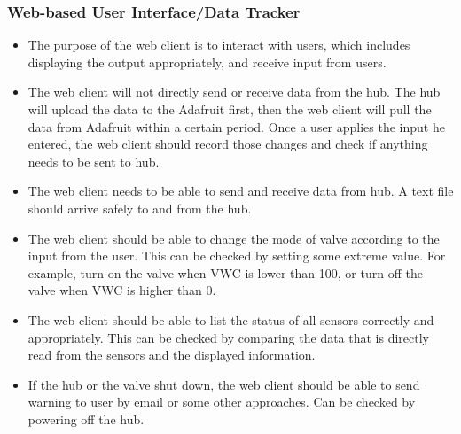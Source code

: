 \documentclass[onecolumn, draftclsnofoot,10pt, compsoc]{IEEEtran}
\newcounter{subsubsubsection}[subsubsection]
\newcounter{subsubsubsubsection}[subsubsubsection]
\begin{document}
      \subsubsection{Web-based User Interface/Data Tracker}
      \begin{itemize}
        \item{The purpose of the web client is to interact with users, which includes displaying the output appropriately, and receive input from users.}
        \item{The web client will not directly send or receive data from the hub.
        The hub will upload the data to the Adafruit first, then the web client will pull the data from Adafruit within a certain period. Once a user applies the input he entered, the web client should record those changes and check if anything needs to be sent to hub.}  
          \item{The web client needs to be able to send and receive data from hub. 
          A text file should arrive safely to and from the hub.}
          \item{The web client should be able to change the mode of valve according to the input from the user.
          This can be checked by setting some extreme value.
          For example, turn on the valve when VWC is lower than 100, or turn off the valve when VWC is higher than 0.}
          \item{The web client should be able to list the status of all sensors correctly and appropriately.
          This can be checked by comparing the data that is directly read from the sensors and the displayed information. }
          \item{If the hub or the valve shut down, the web client should be able to send warning to user by email or some other approaches. Can be checked by powering off the hub.}
      \end{itemize}   
      
\end{document}
